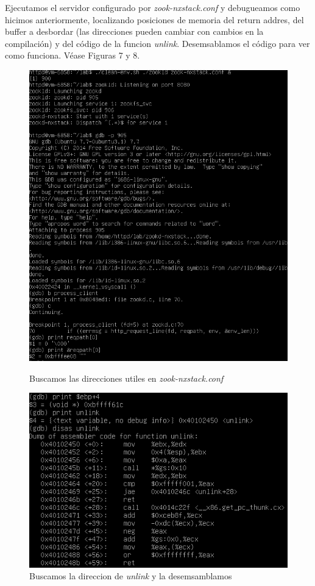 \documentclass[12pt]{article}
\begin{document}
Ejecutamos el servidor configurado por \textit{zook-nxstack.conf} y debugueamos como hicimos anteriormente, localizando posiciones de memoria del return addres, del buffer a desbordar (las direcciones pueden cambiar con cambios en la compilación) y del código de la funcion \textit{unlink}. Desemsablamos el código para ver como funciona. Véase Figuras 7 y 8.
\begin{figure}[htp]
\centering
\includegraphics[scale=0.70]{./imagenes/gdbns1.png}\\
\caption{Buscamos las direcciones utiles en \textit{zook-nxstack.conf}}
\end{figure} 
\begin{figure}[htp]
\centering
\includegraphics[scale=0.75]{./imagenes/gdbns2.png}
\caption{Buscamos la direccion de \textit{unlink} y la desemsamblamos}
\end{figure} 
\end{document}
